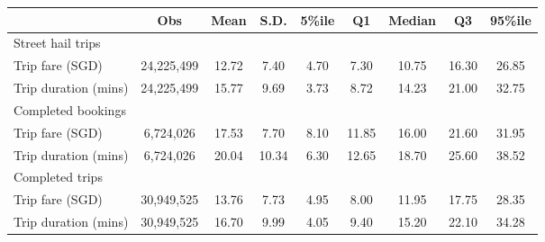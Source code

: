 {
\def\sym#1{\ifmmode^{#1}\else\(^{#1}\)\fi}
\begin{tabular}{l*{1}{cccccccc}}
\toprule
                    &         Obs&        Mean&        S.D.&      5\%ile&          Q1&      Median&          Q3&     95\%ile\\
\midrule
Street hail trips   &            &            &            &            &            &            &            &            \\
Trip fare (SGD)     &  24,225,499&       12.72&        7.40&        4.70&        7.30&       10.75&       16.30&       26.85\\
Trip duration (mins)&  24,225,499&       15.77&        9.69&        3.73&        8.72&       14.23&       21.00&       32.75\\
\midrule
Completed bookings  &            &            &            &            &            &            &            &            \\
Trip fare (SGD)     &   6,724,026&       17.53&        7.70&        8.10&       11.85&       16.00&       21.60&       31.95\\
Trip duration (mins)&   6,724,026&       20.04&       10.34&        6.30&       12.65&       18.70&       25.60&       38.52\\
\midrule
Completed trips     &            &            &            &            &            &            &            &            \\
Trip fare (SGD)     &  30,949,525&       13.76&        7.73&        4.95&        8.00&       11.95&       17.75&       28.35\\
Trip duration (mins)&  30,949,525&       16.70&        9.99&        4.05&        9.40&       15.20&       22.10&       34.28\\
\bottomrule
\end{tabular}
}
